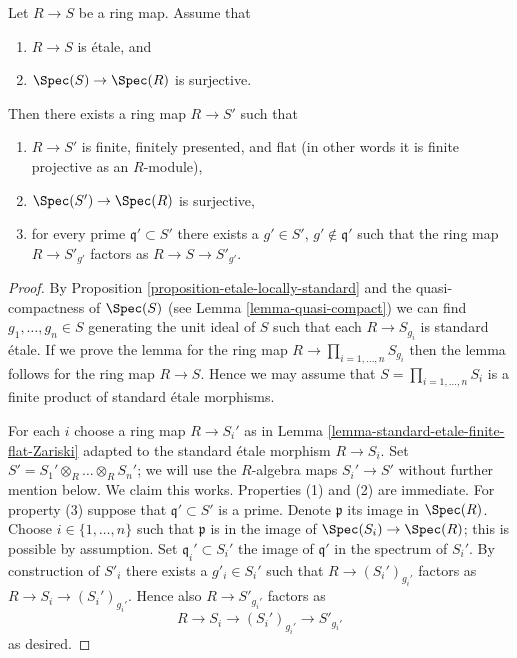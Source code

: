 \begin{lemma}
\label{lemma-etale-finite-flat-zariski}
Let $R \to S$ be a ring map.
Assume that
\begin{enumerate}
\item $R \to S$ is \'etale, and
\item $\Spec(S) \to \Spec(R)$ is surjective.
\end{enumerate}
Then there exists a ring map $R \to S'$ such that
\begin{enumerate}
\item $R \to S'$ is finite, finitely presented, and flat
(in other words it is finite projective as an $R$-module),
\item $\Spec(S') \to \Spec(R)$ is surjective,
\item for every prime $\mathfrak q' \subset S'$ there exists a
$g' \in S'$, $g' \not \in \mathfrak q'$ such that
the ring map $R \to S'_{g'}$ factors as $R \to S \to S'_{g'}$.
\end{enumerate}
\end{lemma}

\begin{proof}
By Proposition \ref{proposition-etale-locally-standard} and
the quasi-compactness of $\Spec(S)$ (see Lemma \ref{lemma-quasi-compact})
we can find $g_1, \ldots, g_n \in S$ generating the unit ideal
of $S$ such that each $R \to S_{g_i}$ is standard \'etale.
If we prove the lemma for the ring map $R \to \prod_{i = 1, \ldots, n} S_{g_i}$
then the lemma follows for the ring map $R \to S$.
Hence we may assume that $S = \prod_{i = 1, \ldots, n} S_i$
is a finite product of standard \'etale morphisms.

\medskip\noindent
For each $i$ choose a ring map $R \to S_i'$ as in
Lemma \ref{lemma-standard-etale-finite-flat-Zariski}
adapted to the standard \'etale morphism $R \to S_i$.
Set $S' = S_1' \otimes_R \ldots \otimes_R S_n'$; we will use
the $R$-algebra maps $S_i' \to S'$ without further mention below.
We claim this works. Properties (1) and (2) are immediate.
For property (3) suppose that $\mathfrak q' \subset S'$ is a prime.
Denote $\mathfrak p$ its image in $\Spec(R)$.
Choose $i \in \{1, \ldots, n\}$ such that $\mathfrak p$
is in the image of $\Spec(S_i) \to \Spec(R)$; this is
possible by assumption. Set $\mathfrak q_i' \subset S_i'$
the image of $\mathfrak q'$ in the spectrum of $S_i'$.
By construction of $S'_i$ there exists a $g'_i \in S_i'$
such that $R \to (S_i')_{g_i'}$ factors as
$R \to S_i \to (S_i')_{g_i'}$. Hence also
$R \to S'_{g_i'}$ factors as
$$
R \to S_i \to (S_i')_{g_i'} \to S'_{g_i'}
$$
as desired.
\end{proof}
